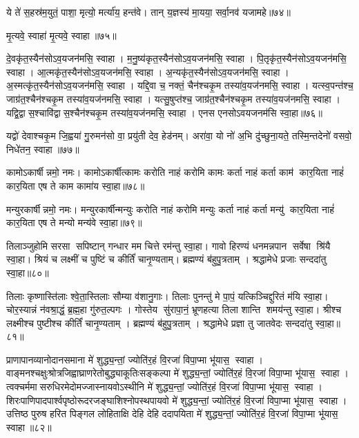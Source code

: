 ये ते॑ स॒हस्र॑म॒युतं॒ पाशा॒ मृत्यो॒ मर्त्या॑य॒ हन्त॑वे। तान् य॒ज्ञस्य॑ मा॒यया॒ सर्वा॒नव॑ यजामहे॥७४॥\anuvakamend
 
मृ॒त्यवे॒ स्वाहा॑ मृ॒त्यवे॒ स्वाहा॥७५॥%
\anuvakamend 

दे॒वकृ॑त॒स्यैन॑सोऽव॒यजन॑मसि॒ स्वाहा। म॒नु॒ष्य॑कृत॒स्यैन॑सो\-ऽव॒यजन॑मसि॒ स्वाहा। 
पि॒तृकृ॑त॒स्यैन॑सो\-ऽव॒यजन॑मसि॒ स्वाहा। आ॒त्मकृ॑त॒स्यैन॑सो\-ऽव॒यजन॑मसि॒ स्वाहा। 
अ॒न्यकृ॑त॒स्यैन॑सो\-ऽव॒यजन॑मसि॒ स्वाहा। अ॒स्मत्कृ॑त॒स्यैन॑सो\-ऽव॒यजन॑मसि॒ स्वाहा। 
यद्दि॒वा च॒ नक्तं॒ चैन॑श्चकृ॒म तस्या॑व॒यज॑नमसि॒ स्वाहा। यत्स्व॒पन्त॑श्च॒ जाग्र॑त॒श्चैन॑श्चकृ॒म तस्या॑व॒यज॑नमसि॒ स्वाहा। 
यत्सु॒षुप्त॑श्च॒ जाग्र॑त॒श्चैन॑श्चकृ॒म तस्या॑व॒यज॑नमसि॒ स्वाहा। यद्वि॒द्वास॒श्चावि॑द्वास॒श्चैन॑श्चकृ॒म तस्या॑व॒यज॑नमसि॒ स्वाहा। एनस एनसोऽवयजनम॑सि स्वा॒हा॥७६॥\anuvakamend

यद्वो॑ देवाश्चकृ॒म जि॒ह्वया॑ गु॒रुमन॑सो वा॒ प्रयु॑ती देव॒ हेड॑नम्। अरा॑वा॒ यो नो॑ अ॒भि दु॑च्छुना॒यते॒ तस्मि॒न्तदेनो॑ वसवो॒ निधे॑तन॒ स्वाहा॥७७॥ \anuvakamend



कामोऽकार्\mbox{}षीन्नमो॒ नमः।  कामोऽकार्\mbox{}षीत्कामः करोति नाहं करोमि कामः कर्ता नाहं कर्ता काम॑ कार॒यिता नाहं॑ कार॒यिता एष ते काम कामा॑य स्वा॒हा॥७८॥
\anuvakamend

मन्युरकार्\mbox{}षीन्नमो॒ नमः। मन्युरकार्\mbox{}षीन्मन्युः करोति नाहं करोमि मन्युः कर्ता नाहं कर्ता मन्यु॑ कार॒यिता नाहं॑ कार॒यिता एष ते मन्यो मन्य॑वे स्वा॒हा॥७९॥
\anuvakamend

तिलाञ्जुहोमि सरसा सपिष्टान् गन्धार मम चित्ते रम॑न्तु स्वा॒हा। गावो हिरण्यं धनमन्नपान सर्वेषा श्रि॑यै स्वा॒हा। श्रियं च लक्ष्मीं च पुष्टिं च कीर्तिं॑ चानृ॒ण्यताम्। ब्रह्मण्यं ब॑हुपु॒त्रताम् । श्रद्धामेधे प्रजाः सन्ददा॑तु स्वा॒हा॥८०॥
\anuvakamend

तिलाः कृष्णास्ति॑लाः श्वे॒ता॒स्तिलाः सौम्या व॑शानु॒गाः। तिलाः पुनन्तु॑ मे पा॒पं॒ यत्किञ्चिद्दुरितं म॑यि स्वा॒हा। चोर॒स्यान्नं न॑वश्रा॒द्धं॒ ब्र॒ह्म॒हा गु॑रुत॒ल्पगः । गोस्तेय सु॑रापा॒नं॒ भ्रूणहत्या तिला शान्ति शमय॑न्तु स्वा॒हा। श्रीश्च लक्ष्मीश्च पुष्टीश्च कीर्तिं॑ चानृ॒ण्यताम् । ब्रह्मण्यं ब॑हुपु॒त्रताम् । श्रद्धामेधे प्रज्ञा तु जातवेदः सन्ददा॑तु स्वा॒हा॥८१॥
 \anuvakamend

प्राणापानव्यानोदानसमाना मे॑ शुद्ध्य॒न्तां॒ ज्योति॑र॒हं वि॒रजा॑ विपा॒प्मा भू॑यास॒ स्वाहा।
वाङ्मनश्चक्षुःश्रोत्रजिह्वाघ्राणरेतो\-बुद्ध्याकूतिः\-सङ्कल्पा मे॑ शुद्ध्य॒न्तां॒ ज्योति॑र॒हं वि॒रजा॑ विपा॒प्मा भू॑यास॒ स्वाहा। त्वक्चर्ममासरुधिरमेदोमज्जास्नायवो\-ऽस्थीनि  मे॑ शुद्ध्य॒न्तां॒ ज्योति॑र॒हं वि॒रजा॑ विपा॒प्मा भू॑यास॒ स्वाहा। शिरःपाणिपादपार्श्वपृष्ठोरूदरजङ्घाशिश्नोपस्थपायवो  मे॑ शुद्ध्य॒न्तां॒ ज्योति॑र॒हं वि॒रजा॑ विपा॒प्मा भू॑यास॒ स्वाहा।
उत्तिष्ठ पुरुष हरित पिङ्गल लोहिताक्षि देहि देहि ददापयिता मे॑ शुद्ध्य॒न्तां॒ ज्योति॑र॒हं वि॒रजा॑ विपा॒प्मा भू॑यास॒ स्वाहा॥८२॥ \anuvakamend


